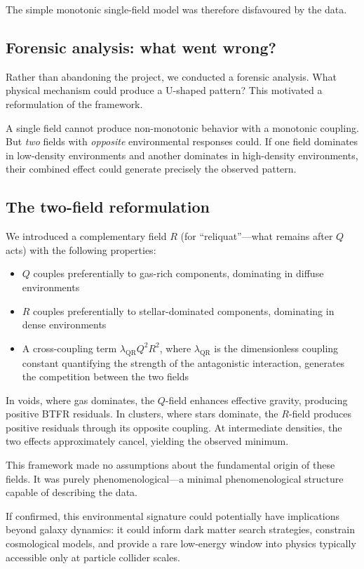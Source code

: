 \documentclass[11pt,a4paper]{article}
\begin{document}
The simple monotonic single-field model was therefore disfavoured by the data.

\subsection*{Forensic analysis: what went wrong?}

Rather than abandoning the project, we conducted a forensic analysis. What physical mechanism could produce a U-shaped pattern? This motivated a reformulation of the framework.

A single field cannot produce non-monotonic behavior with a monotonic coupling. But \textit{two} fields with \textit{opposite} environmental responses could. If one field dominates in low-density environments and another dominates in high-density environments, their combined effect could generate precisely the observed pattern.

\subsection*{The two-field reformulation}

We introduced a complementary field $R$ (for ``reliquat''---what remains after $Q$ acts) with the following properties:
\begin{itemize}
\item $Q$ couples preferentially to gas-rich components, dominating in diffuse environments
\item $R$ couples preferentially to stellar-dominated components, dominating in dense environments
\item A cross-coupling term $\lambda_{\mathrm{QR}} Q^2 R^2$, where $\lambda_{\mathrm{QR}}$ is the dimensionless coupling constant quantifying the strength of the antagonistic interaction, generates the competition between the two fields
\end{itemize}

In voids, where gas dominates, the $Q$-field enhances effective gravity, producing positive BTFR residuals. In clusters, where stars dominate, the $R$-field produces positive residuals through its opposite coupling. At intermediate densities, the two effects approximately cancel, yielding the observed minimum.

This framework made no assumptions about the fundamental origin of these fields. It was purely phenomenological---a minimal phenomenological structure capable of describing the data.

If confirmed, this environmental signature could potentially have implications beyond galaxy dynamics: it could inform dark matter search strategies, constrain cosmological models, and provide a rare low-energy window into physics typically accessible only at particle collider scales.
\end{document}
